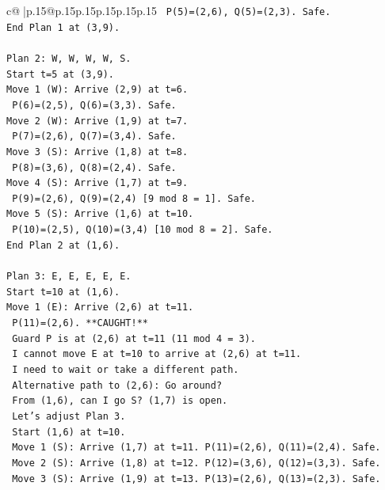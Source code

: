 \documentclass{article}
\begin{document}
{\begin{supertabular}{c@{$\;$}|p{.15\linewidth}@{}p{.15\linewidth}p{.15\linewidth}p{.15\linewidth}p{.15\linewidth}p{.15\linewidth}}
{{{\texttt{  P(5)=(2,6), Q(5)=(2,3). Safe.} \\
\texttt{End Plan 1 at (3,9).} \\
\\ 
\texttt{Plan 2: W, W, W, W, S.} \\
\texttt{Start t=5 at (3,9).} \\
\texttt{Move 1 (W): Arrive (2,9) at t=6.} \\
\texttt{  P(6)=(2,5), Q(6)=(3,3). Safe.} \\
\texttt{Move 2 (W): Arrive (1,9) at t=7.} \\
\texttt{  P(7)=(2,6), Q(7)=(3,4). Safe.} \\
\texttt{Move 3 (S): Arrive (1,8) at t=8.} \\
\texttt{  P(8)=(3,6), Q(8)=(2,4). Safe.} \\
\texttt{Move 4 (S): Arrive (1,7) at t=9.} \\
\texttt{  P(9)=(2,6), Q(9)=(2,4) {[}9 mod 8 = 1{]}. Safe.} \\
\texttt{Move 5 (S): Arrive (1,6) at t=10.} \\
\texttt{  P(10)=(2,5), Q(10)=(3,4) {[}10 mod 8 = 2{]}. Safe.} \\
\texttt{End Plan 2 at (1,6).} \\
\\ 
\texttt{Plan 3: E, E, E, E, E.} \\
\texttt{Start t=10 at (1,6).} \\
\texttt{Move 1 (E): Arrive (2,6) at t=11.} \\
\texttt{  P(11)=(2,6). **CAUGHT!**} \\
\texttt{  Guard P is at (2,6) at t=11 (11 mod 4 = 3).} \\
\texttt{  I cannot move E at t=10 to arrive at (2,6) at t=11.} \\
\texttt{  I need to wait or take a different path.} \\
\texttt{  Alternative path to (2,6): Go around?} \\
\texttt{  From (1,6), can I go S? (1,7) is open.} \\
\texttt{  Let's adjust Plan 3.} \\
\texttt{  Start (1,6) at t=10.} \\
\texttt{  Move 1 (S): Arrive (1,7) at t=11. P(11)=(2,6), Q(11)=(2,4). Safe.} \\
\texttt{  Move 2 (S): Arrive (1,8) at t=12. P(12)=(3,6), Q(12)=(3,3). Safe.} \\
\texttt{  Move 3 (S): Arrive (1,9) at t=13. P(13)=(2,6), Q(13)=(2,3). Safe.} \\
}}}
\end{supertabular}}
\end{document}
